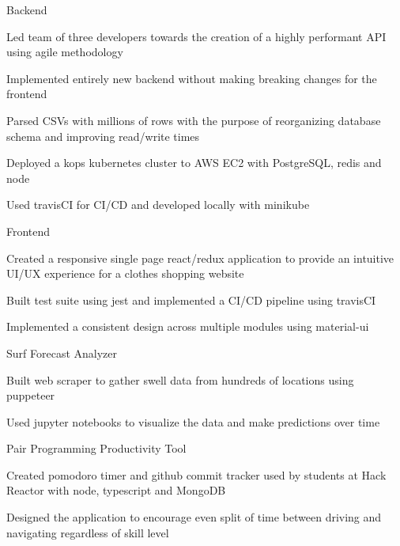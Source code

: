 
\begin{cventries}
  \cventry
    {} %
    {Backend} %
    {} %
    {} %
    {
      \begin{cvitems} %
        \item {Led team of three developers towards the creation of a highly performant API using agile methodology}
        \item {Implemented entirely new backend without making breaking changes for the frontend}
		\item {Parsed CSVs with millions of rows with the purpose of reorganizing database schema and improving read/write times}
		\item {Deployed a kops kubernetes cluster to AWS EC2 with PostgreSQL, redis and node}
		\item {Used travisCI for CI/CD and developed locally with minikube}
      \end{cvitems}
    }
  
  \cventry
    {} %
    {Frontend} %
    {} %
    {} %
    {
      \begin{cvitems} %
		\item {Created a responsive single page react/redux application to provide an intuitive UI/UX experience for a clothes shopping website}
		\item {Built test suite using jest and implemented a CI/CD pipeline using travisCI}
		\item {Implemented a consistent design across multiple modules using material-ui}
      \end{cvitems}
    }

  \cventry
    {} %
    {Surf Forecast Analyzer} %
    {} %
    {} %
    {
      \begin{cvitems} %
      	\item {Built web scraper to gather swell data from hundreds of locations using puppeteer}
		\item {Used jupyter notebooks to visualize the data and make predictions over time}
      \end{cvitems}
    }
    
  \cventry
    {} %
    {Pair Programming Productivity Tool} %
    {} %
    {} %
    {
      \begin{cvitems} %
      	\item {Created pomodoro timer and github commit tracker used by students at Hack Reactor with node, typescript and MongoDB}
      	\item {Designed the application to encourage even split of time between driving and navigating regardless of skill level}
      \end{cvitems}
    }
\end{cventries}